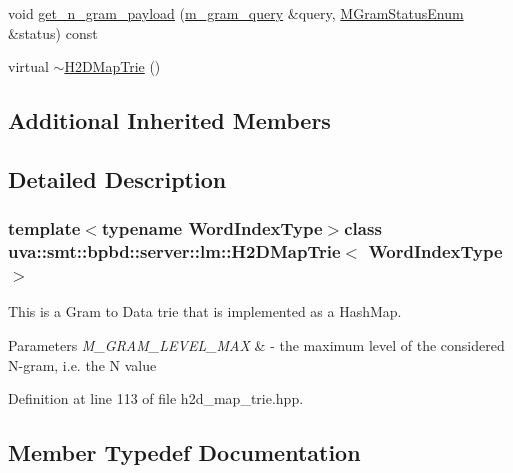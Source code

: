 \begin{DoxyCompactItemize}
\item 
void \hyperlink{classuva_1_1smt_1_1bpbd_1_1server_1_1lm_1_1_h2_d_map_trie_af3c775d38834e068b26544f9ad7a27a4}{get\+\_\+n\+\_\+gram\+\_\+payload} (\hyperlink{classuva_1_1smt_1_1bpbd_1_1server_1_1lm_1_1m__gram__query}{m\+\_\+gram\+\_\+query} \&query, \hyperlink{namespaceuva_1_1smt_1_1bpbd_1_1server_1_1lm_ab9b3e7382b561dcb8abcd6b55e9b796a}{M\+Gram\+Status\+Enum} \&status) const 
\item 
virtual \hyperlink{classuva_1_1smt_1_1bpbd_1_1server_1_1lm_1_1_h2_d_map_trie_af69349c3248d2718947c1b873ab72da3}{$\sim$\+H2\+D\+Map\+Trie} ()
\end{DoxyCompactItemize}
\subsection*{Additional Inherited Members}


\subsection{Detailed Description}
\subsubsection*{template$<$typename Word\+Index\+Type$>$class uva\+::smt\+::bpbd\+::server\+::lm\+::\+H2\+D\+Map\+Trie$<$ Word\+Index\+Type $>$}

This is a Gram to Data trie that is implemented as a Hash\+Map. 
\begin{DoxyParams}{Parameters}
{\em M\+\_\+\+G\+R\+A\+M\+\_\+\+L\+E\+V\+E\+L\+\_\+\+M\+A\+X} & -\/ the maximum level of the considered N-\/gram, i.\+e. the N value \\
\hline
\end{DoxyParams}


Definition at line 113 of file h2d\+\_\+map\+\_\+trie.\+hpp.



\subsection{Member Typedef Documentation}
\hypertarget{classuva_1_1smt_1_1bpbd_1_1server_1_1lm_1_1_h2_d_map_trie_a2830d3f27bbedbdecaa0b50f95dc4920}{}
